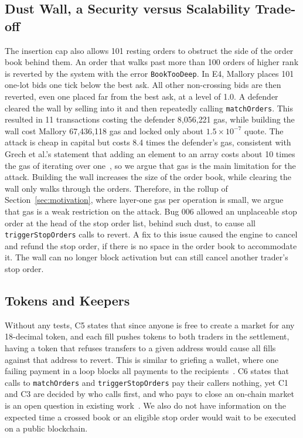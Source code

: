 \subsection{Dust Wall, a Security versus Scalability Trade-off}\label{sec:c4}
The insertion cap also allows 101 resting orders to obstruct the side of the order book behind them. %
An order that walks past more than 100 orders of higher rank is reverted by the system with the error \texttt{BookTooDeep}. %
In E4, Mallory places 101 one-lot bids one tick below the best ask. All other non-crossing bids are then reverted, even one placed far from the best ask, at a level of 1.0. %
A defender cleared the wall by selling into it and then repeatedly calling \texttt{matchOrders}. %
This resulted in 11 transactions costing the defender 8{,}056{,}221 gas, while building the wall cost Mallory 67{,}436{,}118 gas and locked only about $1.5\times10^{-7}$ quote. %
The attack is cheap in capital but costs 8.4 times the defender's gas, consistent with Grech et al.'s statement that adding an element to an array costs about 10 times the gas of iterating over one~\cite{src15grech2018}, so we argue that gas is the main limitation for the attack. %
Building the wall increases the size of the order book, while clearing the wall only walks through the orders.
Therefore, in the rollup of Section~\ref{sec:motivation}, where layer-one gas per operation is small, we argue that gas is a weak restriction on the attack. %
Bug 006 allowed an unplaceable stop order at the head of the stop order list, behind such dust, to cause all \texttt{triggerStopOrders} calls to revert. %
A fix to this issue caused the engine to cancel and refund the stop order, if there is no space in the order book to accommodate it. %
The wall can no longer block activation but can still cancel another trader's stop order.

\subsection{Tokens and Keepers}\label{sec:c56}
Without any tests, C5 states that since anyone is free to create a market for any 18-decimal token, and each fill pushes tokens to both traders in the settlement, having a token that refuses transfers to a given address would cause all fills against that address to revert. %
This is similar to griefing a wallet, where one failing payment in a loop blocks all payments to the recipients~\cite{src15grech2018}. %
C6 states that calls to \texttt{matchOrders} and \texttt{triggerStopOrders} pay their callers nothing, yet C1 and C3 are decided by who calls first, and who pays to close an on-chain market is an open question in existing work~\cite{src09moosavi2023}. %
We also do not have information on the expected time a crossed book or an eligible stop order would wait to be executed on a public blockchain. %
